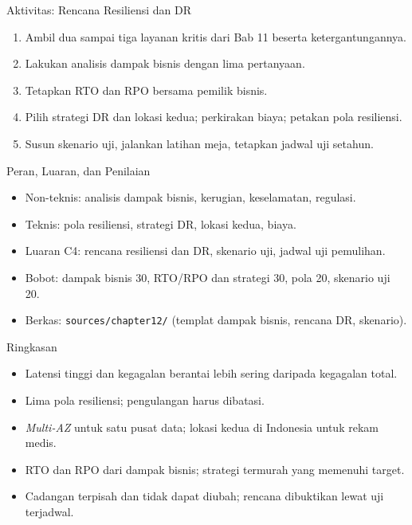 \documentclass[aspectratio=169, table, 12pt]{beamer}
\begin{document}
\begin{frame}{{\Large Aktivitas: Rencana Resiliensi dan DR}}
  \vspace{6pt}
  \small
  \begin{enumerate}
    \item Ambil dua sampai tiga layanan kritis dari Bab 11 beserta ketergantungannya.
    \item Lakukan analisis dampak bisnis dengan lima pertanyaan.
    \item Tetapkan RTO dan RPO bersama pemilik bisnis.
    \item Pilih strategi DR dan lokasi kedua; perkirakan biaya; petakan pola resiliensi.
    \item Susun skenario uji, jalankan latihan meja, tetapkan jadwal uji setahun.
  \end{enumerate}
\end{frame}

\begin{frame}{{\Large Peran, Luaran, dan Penilaian}}
  \vspace{6pt}
  \small
  \begin{itemize}
    \item Non-teknis: analisis dampak bisnis, kerugian, keselamatan, regulasi.
    \item Teknis: pola resiliensi, strategi DR, lokasi kedua, biaya.
    \item Luaran C4: rencana resiliensi dan DR, skenario uji, jadwal uji pemulihan.
    \item Bobot: dampak bisnis 30, RTO/RPO dan strategi 30, pola 20, skenario uji 20.
    \item Berkas: \texttt{sources/chapter12/} (templat dampak bisnis, rencana DR, skenario).
  \end{itemize}
\end{frame}

\begin{frame}{{\Large Ringkasan}}
  \vspace{6pt}
  \small
  \begin{itemize}
    \item Latensi tinggi dan kegagalan berantai lebih sering daripada kegagalan total.
    \item Lima pola resiliensi; pengulangan harus dibatasi.
    \item \textit{Multi-AZ} untuk satu pusat data; lokasi kedua di Indonesia untuk rekam medis.
    \item RTO dan RPO dari dampak bisnis; strategi termurah yang memenuhi target.
    \item Cadangan terpisah dan tidak dapat diubah; rencana dibuktikan lewat uji terjadwal.
  \end{itemize}
\end{frame}
\end{document}
